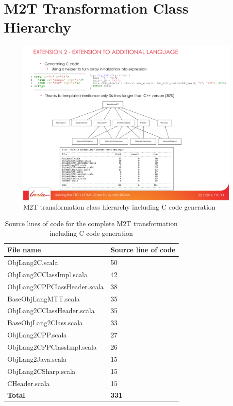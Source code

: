 
\section{M2T Transformation Class Hierarchy}
\label{sec:M2TClassHierarchy}

\begin{figure}[h!bt]
  \centering
  \includegraphics[width=\textwidth]{figures/M2TClassHierarchy.pdf}
  \caption{M2T transformation class hierarchy including C code generation}
  \label{fig:M2TClassHierarchy}
\end{figure}

\begin{table}
	\centering
  \begin{tabular}{l|l}
  \hline
  \textbf{File name}                  & \textbf{Source line of code} \\ \hline
  ObjLang2C.scala              & 50                  \\
  ObjLang2CClassImpl.scala     & 42                  \\
  ObjLang2CPPClassHeader.scala & 38                  \\
  BaseObjLangMTT.scala         & 35                  \\
  ObjLang2CClassHeader.scala   & 35                  \\
  BaseObjLang2Class.scala      & 33                  \\
  ObjLang2CPP.scala            & 27                  \\
  ObjLang2CPPClassImpl.scala   & 26                  \\
  ObjLang2Java.scala           & 15                  \\
  ObjLang2CSharp.scala         & 15                  \\
  CHeader.scala                & 15                  \\ \hline
  \textbf{Total}                        & \textbf{331}                 \\ \hline
  \end{tabular}
  \caption{Source lines of code for the complete M2T transformation including C code generation}
\end{table}